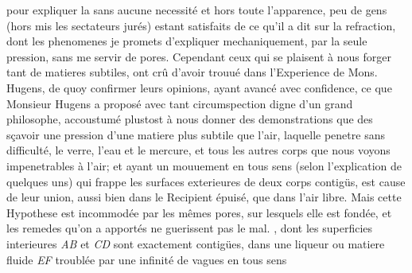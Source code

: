 pour expliquer la  sans aucune necessit\'{e} et hors toute l'apparence, peu de gens (hors mis les sectateurs jur\'{e}s) estant satisfaits de ce qu'il a dit sur la refraction\protect{}, dont les phenomenes je promets d'expliquer mechaniquement, par la seule pression, sans me servir de pores. Cependant ceux qui se plaisent \`{a} nous forger tant de matieres subtiles\protect{}, ont crû d'avoir trouu\'{e} dans l'Experience de Mons. Hugens\protect{}, de quoy confirmer leurs opinions, ayant avanc\'{e} avec confidence, ce que Monsieur Hugens\protect{} a propos\'{e} avec tant  circumspection digne d'un grand philo\-sophe, accoustum\'{e} plustost \`{a} nous donner des demonstrations que des  s\c{c}avoir une pression d'une matiere\protect{} plus subtile que l'air, laquelle penetre sans difficult\'{e}, le verre, l'eau et le mercure\protect{}, et tous les autres corps\protect{} que nous voyons impenetrables \`{a} l'air; et ayant un mouuement en tous sens (selon l'explication de quelques uns) qui frappe  les surfaces exterieures de deux corps\protect{} contig\"{u}s, est cause de leur union, aussi bien dans le Recipient \'{e}puis\'{e}, que dans l'air libre. 
Mais cette Hypothese est incommod\'{e}e par les mêmes pores, sur lesquels elle est fond\'{e}e, et les remedes qu'on a apport\'{e}s ne guerissent pas le mal. ,  dont les superficies interieures \textit{AB} et \textit{CD} sont exactement contig\"{u}es, dans une liqueur\protect{} ou matiere fluide\protect{} \textit{EF}  troubl\'{e}e par une infinit\'{e} de vagues en tous sens